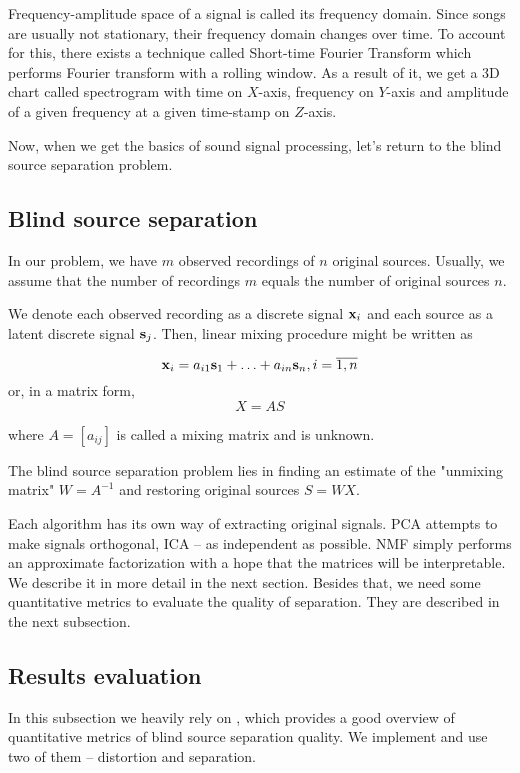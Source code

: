\documentclass[../main.tex]{subfiles} %
\begin{document}
Frequency-amplitude space of a signal is called its frequency domain.
Since songs are usually not stationary, their frequency domain changes over time. 
To account for this, there exists a technique called Short-time Fourier Transform \cite{stft} which performs Fourier transform with a rolling window. 
As a result of it, we get a 3D chart called spectrogram with time on $X$-axis, frequency on $Y$-axis and amplitude of a given frequency at a given time-stamp on $Z$-axis.

Now, when we get the basics of sound signal processing, let's return to the blind source separation problem.

\subsection{Blind source separation}

In our problem, we have $m$ observed recordings of $n$ original sources. Usually, we assume that the number of recordings $m$ equals the number of original sources $n$.

We denote each observed recording as a discrete signal ${\mathbf x}_i$ and each source as a latent discrete signal ${\mathbf s}_j$. Then, linear mixing procedure might be written as

\[{\mathbf x}_i = a_{i1} {\mathbf s}_1 + \ldots + a_{in} {\mathbf s}_n, i = \overline{1, n}\]
or, in a matrix form,
\[X = A S\]

where $A = \left[a_{ij} \right]$ is called a mixing matrix and is unknown. 

The blind source separation problem lies in finding an estimate of the "unmixing matrix" $W = A^{-1}$  and restoring original sources $S = W X$. 

Each algorithm has its own way of extracting original signals. PCA attempts to make signals orthogonal, ICA -- as independent as possible. NMF simply performs an approximate factorization with a hope that the matrices will be interpretable. We describe it in more detail in the next section. 
Besides that, we need some quantitative metrics to evaluate the quality of separation. They are described in the next subsection.

\subsection{Results evaluation}

In this subsection we heavily rely on \cite{eval}, which provides a good overview of quantitative metrics of blind source separation quality. We implement and use two of them -- distortion and separation.
\end{document}
